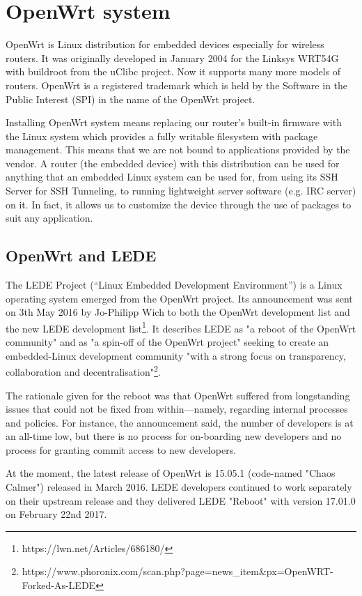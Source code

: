 \section{OpenWrt system}\label{owrt}
OpenWrt is Linux distribution for embedded devices especially for wireless routers.
It was originally developed in January 2004 for the Linksys WRT54G with buildroot from the uClibc project.
Now it supports many more models of routers.
OpenWrt is a registered trademark which is held by the Software in the Public Interest (SPI) in the name of the OpenWrt project.

Installing OpenWrt system means replacing our router’s built-in firmware with the Linux system which provides a fully writable filesystem with package management.
This means that we are not bound to applications provided by the vendor.
A router (the embedded device) with this distribution can be used for anything that an embedded Linux system can be used for, from using its SSH Server for SSH Tunneling, to running lightweight server software (e.g. IRC server) on it.
In fact, it allows us to customize the device through the use of packages to suit any application. \cite{openwrt}



\subsection{OpenWrt and LEDE}

The LEDE Project (“Linux Embedded Development Environment”) is a Linux operating system emerged from the OpenWrt project.
Its announcement was sent on 3th May 2016 by Jo-Philipp Wich to both the OpenWrt development list and the new LEDE development list\footnote{https://lwn.net/Articles/686180/}.
It describes LEDE as "a reboot of the OpenWrt community" and as "a spin-off of the OpenWrt project" seeking to create an embedded-Linux development community "with a strong focus on transparency, collaboration and decentralisation"\footnote{https://www.phoronix.com/scan.php?page=news\_item\&px=OpenWRT-Forked-As-LEDE}.

The rationale given for the reboot was that OpenWrt suffered from longstanding issues that could not be fixed from within—namely, regarding internal processes and policies.
For instance, the announcement said, the number of developers is at an all-time low, but there is no process for on-boarding new developers and no process for granting commit access to new developers.

At the moment, the latest release of OpenWrt is 15.05.1 (code-named "Chaos Calmer") released in March 2016.
LEDE developers continued to work separately on their upstream release and they delivered LEDE "Reboot" with version 17.01.0 on February 22nd 2017.


